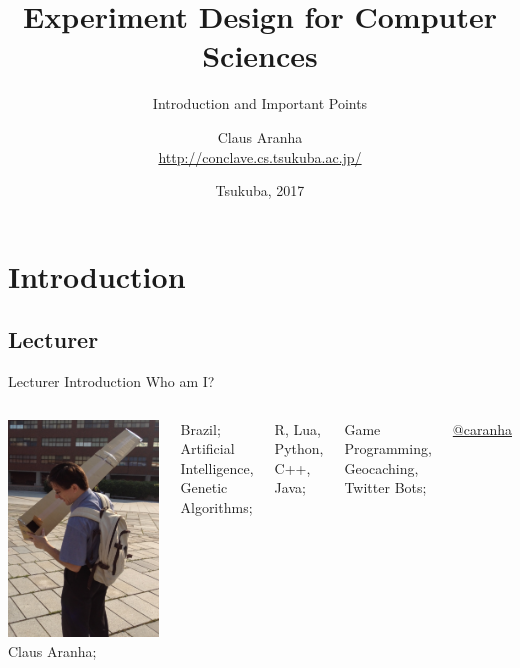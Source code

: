 \documentclass[t]{beamer}
\title[]{Experiment Design for Computer Sciences}
\subtitle[]{Introduction and Important Points}
\author[]{Claus Aranha\\{\footnotesize \url{http://conclave.cs.tsukuba.ac.jp/}}}
\institute{Computer Science Department}
\date{\scriptsize Tsukuba, 2017}
\begin{document}
\section{Introduction}
\subsection{Lecturer}
\begin{frame}
  \titlepage
\end{frame}


\begin{ftst}
{Lecturer Introduction}
{Who am I?}
\begin{columns}[T]
  \includegraphics[width=1\textwidth]{../../../figs/pinhole}
  \bitems {} Claus Aranha;
  \item {} Brazil;
  \spitem {} Artificial Intelligence, Genetic
  Algorithms;
  \item {} R, Lua, Python, C++, Java;
  \item {} Game Programming, Geocaching, Twitter
    Bots;

  \spitem {} \href{http://www.twitter.com/caranha}{@caranha}
  \eitem
\end{columns}
\end{ftst}
\end{document}
